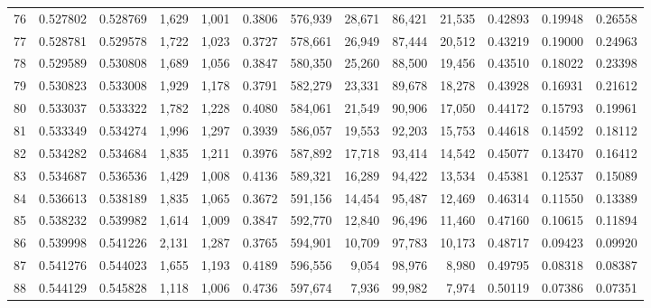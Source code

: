 \begin{tabular}{rrrrrrrrrrrrr}
76 &  0.527802 &  0.528769 &   1,629 &  1,001 &                                     0.3806 &  576,939 &   28,671 &   86,421 &   21,535 &  0.42893 &  0.19948 &  0.26558 \\
77 &  0.528781 &  0.529578 &   1,722 &  1,023 &                                     0.3727 &  578,661 &   26,949 &   87,444 &   20,512 &  0.43219 &  0.19000 &  0.24963 \\
78 &  0.529589 &  0.530808 &   1,689 &  1,056 &                                     0.3847 &  580,350 &   25,260 &   88,500 &   19,456 &  0.43510 &  0.18022 &  0.23398 \\
79 &  0.530823 &  0.533008 &   1,929 &  1,178 &                                     0.3791 &  582,279 &   23,331 &   89,678 &   18,278 &  0.43928 &  0.16931 &  0.21612 \\
80 &  0.533037 &  0.533322 &   1,782 &  1,228 &                                     0.4080 &  584,061 &   21,549 &   90,906 &   17,050 &  0.44172 &  0.15793 &  0.19961 \\
81 &  0.533349 &  0.534274 &   1,996 &  1,297 &                                     0.3939 &  586,057 &   19,553 &   92,203 &   15,753 &  0.44618 &  0.14592 &  0.18112 \\
82 &  0.534282 &  0.534684 &   1,835 &  1,211 &                                     0.3976 &  587,892 &   17,718 &   93,414 &   14,542 &  0.45077 &  0.13470 &  0.16412 \\
83 &  0.534687 &  0.536536 &   1,429 &  1,008 &                                     0.4136 &  589,321 &   16,289 &   94,422 &   13,534 &  0.45381 &  0.12537 &  0.15089 \\
84 &  0.536613 &  0.538189 &   1,835 &  1,065 &                                     0.3672 &  591,156 &   14,454 &   95,487 &   12,469 &  0.46314 &  0.11550 &  0.13389 \\
85 &  0.538232 &  0.539982 &   1,614 &  1,009 &                                     0.3847 &  592,770 &   12,840 &   96,496 &   11,460 &  0.47160 &  0.10615 &  0.11894 \\
86 &  0.539998 &  0.541226 &   2,131 &  1,287 &                                     0.3765 &  594,901 &   10,709 &   97,783 &   10,173 &  0.48717 &  0.09423 &  0.09920 \\
87 &  0.541276 &  0.544023 &   1,655 &  1,193 &                                     0.4189 &  596,556 &    9,054 &   98,976 &    8,980 &  0.49795 &  0.08318 &  0.08387 \\
88 &  0.544129 &  0.545828 &   1,118 &  1,006 &                                     0.4736 &  597,674 &    7,936 &   99,982 &    7,974 &  0.50119 &  0.07386 &  0.07351 \\

\end{tabular}
